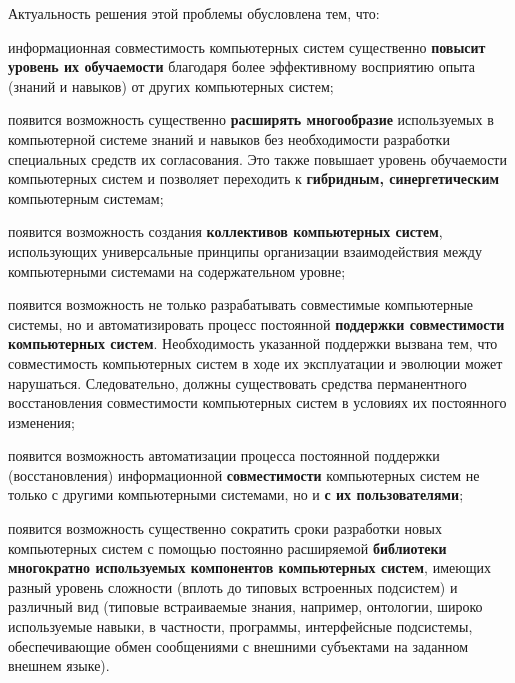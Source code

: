 \begin{SCn}
{Актуальность решения этой проблемы обусловлена тем, что:
\begin{scnitemize}
    \item информационная совместимость компьютерных систем существенно \textbf{повысит уровень их обучаемости} благодаря более эффективному восприятию опыта (знаний и навыков) от других  компьютерных систем;
    \item появится возможность существенно \textbf{расширять многообразие} используемых в компьютерной системе знаний и навыков без необходимости разработки специальных средств их согласования. Это также повышает уровень обучаемости компьютерных систем и позволяет переходить к \textbf{гибридным, синергетическим} компьютерным системам;
    \item появится возможность создания \textbf{коллективов компьютерных систем}, использующих универсальные принципы организации взаимодействия между компьютерными системами на содержательном уровне;
    \item появится возможность не только разрабатывать совместимые компьютерные системы, но и автоматизировать процесс постоянной \textbf{поддержки совместимости компьютерных систем}. Необходимость указанной поддержки вызвана тем, что совместимость компьютерных систем в ходе их эксплуатации и эволюции может нарушаться. Следовательно, должны существовать средства перманентного восстановления совместимости компьютерных систем в условиях их постоянного изменения;
    \item появится возможность автоматизации процесса постоянной поддержки (восстановления) информационной \textbf{совместимости} компьютерных систем не только с другими компьютерными системами, но и \textbf{с их пользователями};
    \item появится возможность существенно сократить сроки разработки новых компьютерных систем с помощью постоянно расширяемой \textbf{библиотеки многократно используемых компонентов компьютерных систем}, имеющих разный уровень сложности (вплоть до типовых встроенных подсистем) и различный вид (типовые встраиваемые знания, например, онтологии, широко используемые навыки, в частности, программы,  интерфейсные подсистемы, обеспечивающие обмен сообщениями с внешними субъектами на заданном внешнем языке).
\end{scnitemize}}

\end{SCn}
